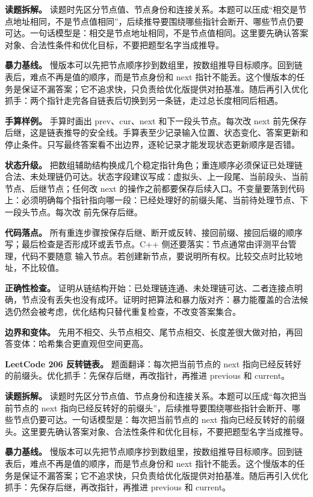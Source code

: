 \textbf{读题拆解。} 读题时先区分节点值、节点身份和连接关系。本题可以压成“相交是节点地址相同，不是节点值相同”，后续推导要围绕哪些指针会断开、哪些节点仍要可达。一句话模型是：相交是节点地址相同，不是节点值相同。这里要先确认答案对象、合法性条件和优化目标，不要把题型名字当成推导。

\textbf{暴力基线。} 慢版本可以先把节点顺序抄到数组里，按数组推导目标顺序。回到链表后，难点不再是值的顺序，而是节点身份和 next 指针不能丢。这个慢版本的任务是保证不漏答案；它不追求快，只负责给优化版提供对拍基准。随后再引入优化抓手：两个指针走完各自链表后切换到另一条链，走过总长度相同后相遇。

\textbf{手算样例。} 手算时画出 prev、cur、next 和下一段头节点。每次改 next 前先保存后继，这是链表推导的安全线。手算表至少记录输入位置、状态变化、答案更新和停止条件。只写最终答案看不出边界，逐轮记录才能发现状态更新顺序是否错。

\textbf{状态升级。} 把数组辅助结构换成几个稳定指针角色；重连顺序必须保证已处理链合法、未处理链仍可达。状态字段建议写成：虚拟头、上一段尾、当前段头、当前节点、后继节点；任何改 next 的操作之前都要保存后续入口。不变量要落到代码上：必须明确每个指针指向哪一段：已经处理好的前缀头尾、当前待处理节点、下一段头节点。每次改  前先保存后继。

\textbf{代码落点。} 所有重连步骤按保存后继、断开或反转、接回前缀、接回后缀的顺序写；最后检查是否形成环或丢节点。C++ 侧还要落实：节点通常由评测平台管理，代码不要随意  输入节点。若创建新节点，要说明所有权。比较交点时比较地址，不比较值。

\textbf{正确性检查。} 证明从链结构开始：已处理链连通、未处理链可达、二者连接点明确，节点没有丢失也没有成环。证明时把算法和暴力版对齐：暴力能覆盖的合法候选仍然会被考虑，优化结构只替代重复检查，不改变答案集合。

\textbf{边界和变体。} 先用不相交、头节点相交、尾节点相交、长度差很大做对拍，再回答变体：哈希集合更直观但空间更高。

\noindent\textbf{LeetCode 206 反转链表。} 题面翻译：每次把当前节点的 next 指向已经反转好的前缀头。优化抓手：先保存后继，再改指针，再推进 previous 和 current。

\textbf{读题拆解。} 读题时先区分节点值、节点身份和连接关系。本题可以压成“每次把当前节点的 next 指向已经反转好的前缀头”，后续推导要围绕哪些指针会断开、哪些节点仍要可达。一句话模型是：每次把当前节点的 next 指向已经反转好的前缀头。这里要先确认答案对象、合法性条件和优化目标，不要把题型名字当成推导。

\textbf{暴力基线。} 慢版本可以先把节点顺序抄到数组里，按数组推导目标顺序。回到链表后，难点不再是值的顺序，而是节点身份和 next 指针不能丢。这个慢版本的任务是保证不漏答案；它不追求快，只负责给优化版提供对拍基准。随后再引入优化抓手：先保存后继，再改指针，再推进 previous 和 current。

